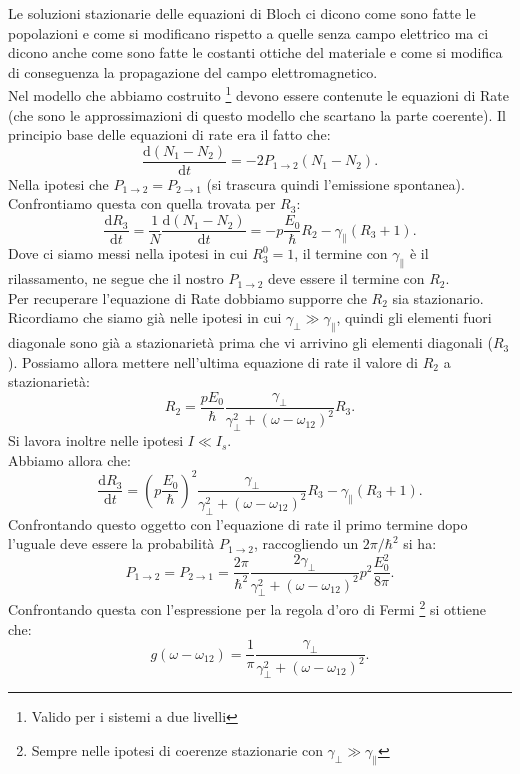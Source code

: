 Le soluzioni stazionarie delle equazioni di Bloch ci dicono come sono fatte le popolazioni e come si modificano rispetto a quelle senza campo elettrico ma ci dicono anche come sono fatte le costanti ottiche del materiale e come si modifica di conseguenza la propagazione del campo elettromagnetico.\\
Nel modello che abbiamo costruito
\footnote{Valido per i sistemi a due livelli} devono essere contenute le equazioni di Rate (che sono le approssimazioni di questo modello che scartano la parte coerente). Il principio base delle equazioni di rate era il fatto che:
\[
    \frac{\text{d} \left(N_1-N_2\right)}{\text{d} t} = 
    -2 P_{1\to 2}\left(N_1-N_2\right)
.\] 
Nella ipotesi che $P_{1\to 2}= P_{2\to 1}$ (si trascura quindi l'emissione spontanea). Confrontiamo questa con quella trovata per $R_3$:
\[
\frac{\text{d} R_3}{\text{d} t} =
\frac{1}{N} \frac{\text{d} \left(N_1-N_2\right)}{\text{d} t} =
- p \frac{E_0}{\hbar }R_2-\gamma_\parallel\left(R_3+1\right)
.\] 
Dove ci siamo messi nella ipotesi in cui $R_3^0 = 1$, il termine con $\gamma_\parallel$ è il rilassamento, ne segue che il nostro $P_{1\to 2}$ deve essere il termine con $R_2$.\\
Per recuperare l'equazione di Rate dobbiamo supporre che $R_2$ sia stazionario.
Ricordiamo che siamo già nelle ipotesi in cui $\gamma_\perp\gg\gamma_\parallel$, quindi gli elementi fuori diagonale sono già a stazionarietà prima che vi arrivino gli elementi diagonali ($R_3$). Possiamo allora mettere nell'ultima equazione di rate il valore di $R_2$ a stazionarietà:
\[
    R_2 = \frac{pE_0}{\hbar } 
    \frac{\gamma_\perp}{\gamma_\perp^2 + \left(\omega-\omega_{12}\right)^2}R_3
.\] 
Si lavora inoltre nelle ipotesi $I\ll I_s$.\\
Abbiamo allora che:
\[
\frac{\text{d} R_3}{\text{d} t} =
\left(p \frac{E_0}{\hbar }\right)^2 
\frac{\gamma_\perp}
{\gamma_\perp^2+\left(\omega-\omega_{12}\right)^2}
R_3-\gamma_\parallel\left(R_3+1\right)
.\] 
Confrontando questo oggetto con l'equazione di rate il primo termine dopo l'uguale deve essere la probabilità $P_{1\to 2}$, raccogliendo un $2\pi /\hbar ^2$ si ha:
\[
    P_{1\to 2}=P_{2\to 1} =
    \frac{2\pi}{\hbar ^2} 
    \frac{2\gamma_\perp}
    {\gamma_\perp^2+\left(\omega-\omega_{12}\right)^2}
    p^2 \frac{E_0^2}{8\pi}
.\] 
Confrontando questa con l'espressione per la regola d'oro di Fermi
\footnote{Sempre nelle ipotesi di coerenze stazionarie con $\gamma_\perp\gg\gamma_\parallel$}
 si ottiene che:
\[
    g(\omega-\omega_{12}) = \frac{1}{\pi}
    \frac{\gamma_\perp}
    {\gamma_\perp^2+\left(\omega-\omega_{12}\right)^2}
.\] 

